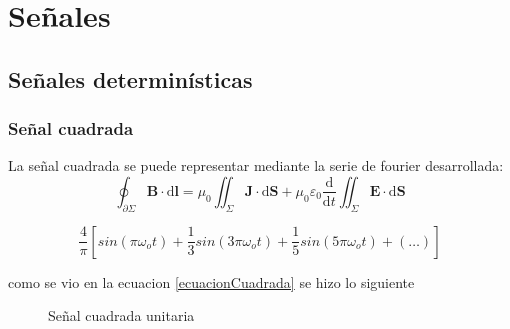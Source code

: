 \documentclass{article}
\begin{document}
\section{Señales}

\subsection{Señales determinísticas}

\subsubsection{Señal cuadrada}

La señal cuadrada se puede representar mediante la serie de fourier desarrollada:\citep{SeriesFourier}\\

\begin{equation}
    \oint_{\partial \Sigma} \mathbf{B} \cdot \mathrm{d}\boldsymbol{l} = \mu_0 \iint_{\Sigma} \mathbf{J} \cdot \mathrm{d}\mathbf{S} + \mu_0 \varepsilon_0 \frac{\mathrm{d}}{\mathrm{d}t} \iint_{\Sigma} \mathbf{E} \cdot \mathrm{d}\mathbf{S}
\end{equation}

\begin{equation}
    \frac{4}{\pi}[sin(\pi \omega_o t)+\frac{1}{3}sin(3 \pi \omega_o t)+\frac{1}{5}sin(5 \pi \omega_o t)+(\ldots)]
    \label{ecuacionCuadrada}
\end{equation}



como se vio en la ecuacion \ref{ecuacionCuadrada} se hizo lo siguiente

\begin{figure}[h!]
    \centering

\caption{Señal cuadrada unitaria}
\label{Senalcuadrada20pp}
\end{figure}
\end{document}
